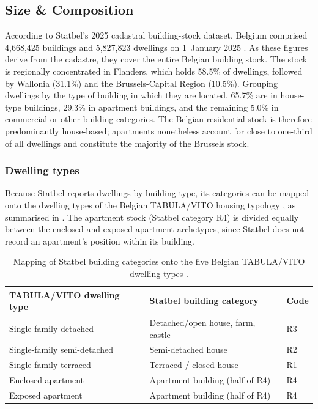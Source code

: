 \subsection{Size \& Composition}\label{sec:size_compo}
According to Statbel's 2025 cadastral building-stock dataset, Belgium comprised
4{,}668{,}425 buildings and 5{,}827{,}823 dwellings on 1~January 2025
\cite{statbel_building_stock_2025}. As these figures derive from the cadastre,
they cover the entire Belgian building stock. The stock is regionally
concentrated in Flanders, which holds 58.5\% of dwellings, followed by Wallonia
(31.1\%) and the Brussels-Capital Region (10.5\%). Grouping dwellings by the type
of building in which they are located, 65.7\% are in house-type buildings, 29.3\%
in apartment buildings, and the remaining 5.0\% in commercial or other building
categories. The Belgian residential stock is therefore predominantly
house-based; apartments nonetheless account for close to one-third of all
dwellings and constitute the majority of the Brussels stock.

\subsubsection*{Dwelling types}
Because Statbel reports dwellings by building type, its categories can be mapped
onto the dwelling types of the Belgian TABULA/VITO housing typology
\cite{tabula_be_vito}, as summarised in . The
apartment stock (Statbel category R4) is divided equally between the enclosed and
exposed apartment archetypes, since Statbel does not record an apartment's
position within its building.

\begin{table}[ht]
  \centering
  \caption{Mapping of Statbel building categories onto the five Belgian
           TABULA/VITO dwelling types \cite{tabula_be_vito,statbel_building_stock_2025}.}
  \label{tab:dwelling_type_mapping}
  \begin{tabular}{lll}
    \toprule
    TABULA/VITO dwelling type & Statbel building category & Code \\
    \midrule
    Single-family detached      & Detached/open house, farm, castle & R3 \\
    Single-family semi-detached & Semi-detached house               & R2 \\
    Single-family terraced      & Terraced / closed house           & R1 \\
    Enclosed apartment          & Apartment building (half of R4)   & R4 \\
    Exposed apartment           & Apartment building (half of R4)   & R4 \\
    \bottomrule
  \end{tabular}
\end{table}

